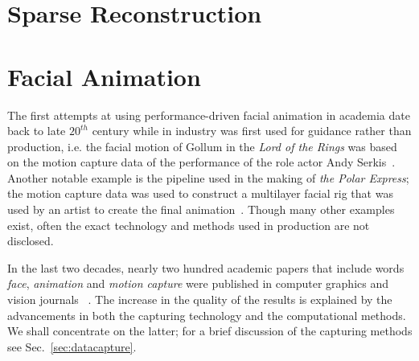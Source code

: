 \documentclass[11pt]{report}
\begin{document}
\section{Sparse Reconstruction}


\section{Facial Animation}



The first attempts at using performance-driven facial animation in academia date back to late $20^{th}$ century while in industry was first used for guidance rather than production, i.e. the facial motion of Gollum in the \textit{Lord of the Rings} was based on the motion capture data of the performance of the role actor Andy Serkis~\cite{Pighin:2002}. Another notable example is the pipeline used in the making of \textit{the Polar Express}; the motion capture data was used to construct a multilayer facial rig that was used by an artist to create the final animation~\cite{Bennett:2005}. Though many other examples exist, often the exact technology and methods used in production are not disclosed. %

In the last two decades, nearly two hundred academic papers that include words \textit{face}, \textit{animation} and \textit{motion capture} were published in computer graphics and vision journals ~\cite{Scopus}. The increase in the quality of the results is explained by the advancements in both the capturing technology and the computational methods. We shall concentrate on the latter; for a brief discussion of the capturing methods see Sec.~\ref{sec:datacapture}. 
\end{document}
